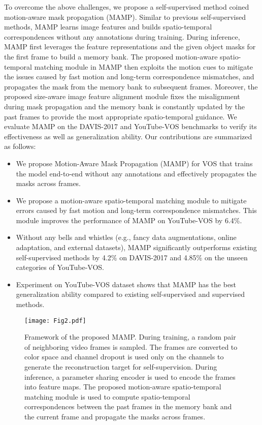 \documentclass[letterpaper]{article} \usepackage{aaai22}  \usepackage{times}  \usepackage{helvet}  \usepackage{courier}  \usepackage[hyphens]{url}  \usepackage{graphicx} \urlstyle{rm} \def\UrlFont{\rm}  \usepackage{natbib}  \usepackage{caption} \DeclareCaptionStyle{ruled}{labelfont=normalfont,labelsep=colon,strut=off} \frenchspacing  \setlength{\pdfpagewidth}{8.5in}  \setlength{\pdfpageheight}{11in}  \usepackage{algorithm}
\begin{document}
To overcome the above challenges, we propose a self-supervised method coined motion-aware mask propagation (MAMP). Similar to previous self-supervised methods, MAMP learns image features and builds spatio-temporal correspondences without any annotations during training. During inference, MAMP first leverages the feature representations and the given object masks for the first frame to build a memory bank. The proposed motion-aware spatio-temporal matching module in MAMP then exploits the motion cues to mitigate the issues caused by fast motion and long-term correspondence mismatches, and propagates the mask from the memory bank to subsequent frames. Moreover, the proposed size-aware image feature alignment module fixes the misalignment during mask propagation and the memory bank is constantly updated by the past frames to provide the most appropriate spatio-temporal guidance. We evaluate MAMP on the DAVIS-2017 and YouTube-VOS benchmarks to verify its effectiveness as well as generalization ability.
Our contributions are summarized as follows:
\begin{itemize}
\item[] We propose Motion-Aware Mask Propagation (MAMP) for VOS that trains the model end-to-end without any annotations and effectively propagates the masks across frames.
\item[] We propose a motion-aware spatio-temporal matching module to mitigate errors caused by fast motion and long-term correspondence mismatches. This module improves the performance of MAMP on YouTube-VOS by 6.4\%.
\item[] Without any bells and whistles (e.g., fancy data augmentations, online adaptation, and external datasets), MAMP significantly outperforms existing self-supervised methods by 4.2\% on DAVIS-2017 and 4.85\% on the unseen categories of YouTube-VOS.
\item[] Experiment on YouTube-VOS dataset shows that MAMP has the best generalization ability compared to existing self-supervised and supervised methods.
\end{itemize}


\begin{figure*}[t!] \centering
\texttt{[image: Fig2.pdf]}
\caption{{Framework of the proposed MAMP. During training, a random pair of neighboring video frames is sampled. The frames are converted to  color space and channel dropout is used only on the  channels to generate the reconstruction target for self-supervision. During inference, a parameter sharing encoder is used to encode the frames into feature maps. The proposed motion-aware spatio-temporal matching module is used to compute spatio-temporal correspondences between the past frames in the memory bank and the current frame and propagate the masks across frames.}}
\label{fig:2}
\end{figure*}
\end{document}
